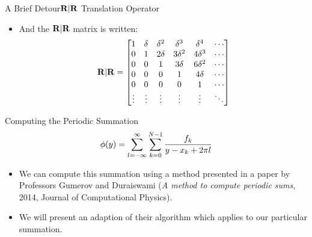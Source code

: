 \documentclass{beamer}
\begin{document}
\begin{frame}{A Brief Detour}{$\bold{R}|\bold{R}$ Translation Operator}
  \begin{itemize}
  \item And the $\bold{R}|\bold{R}$ matrix is written:
    \begin{align*}
      \bold{R}|\bold{R} = \begin{bmatrix}
        1 & \delta & \delta^2 & \delta^3 & \delta^4 & \cdots \\
        0 & 1 & 2\delta & 3 \delta^2 & 4\delta^3 & \cdots \\
        0 & 0 & 1 & 3 \delta & 6\delta^2 & \cdots \\
        0 & 0 & 0 & 1 & 4 \delta & \cdots \\
        0 & 0 & 0 & 0 & 1 & \cdots \\
        \vdots & \vdots & \vdots & \vdots & \vdots & \ddots
      \end{bmatrix}
    \end{align*}
  \end{itemize}
\end{frame}

\begin{frame}{Computing the Periodic Summation}
  \begin{align*}
    \phi(y) = \sum_{l=-\infty}^\infty \sum_{k=0}^{N-1} {f_k \over y - x_k + 2 \pi l}
  \end{align*}
  \begin{itemize}
  \item We can compute this summation using a method presented in a
    paper by Professors Gumerov and Duraiswami (\emph{A method to
      compute periodic sums}, 2014, Journal of Computational Physics).
    \pause
  \item We will present an adaption of their algorithm which applies to
    our particular summation.
  \end{itemize}
\end{frame}
\end{document}
